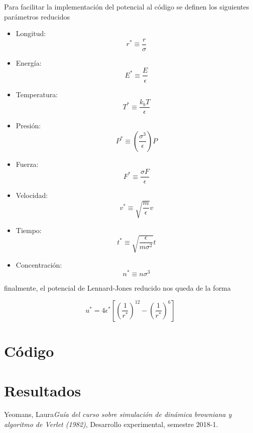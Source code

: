 \documentclass[12pt,letterpaper]{article}
\begin{document}
Para facilitar la implementación del potencial al código se definen los siguientes parámetros reducidos

\begin{itemize}
\item Longitud: \begin{equation*}
r^* \equiv \frac{r}{\sigma}
\end{equation*}
\item Energía: \begin{equation*}
E^* \equiv \frac{E}{\epsilon}
\end{equation*}
\item Temperatura: \begin{equation*}
T^* \equiv \frac{k_bT}{\epsilon}
\end{equation*}
\item Presión: \begin{equation*}
P^* \equiv \left(\frac{\sigma^3}{\epsilon}\right) P
\end{equation*}
\item Fuerza: \begin{equation*}
F^* \equiv \frac{\sigma F}{\epsilon}
\end{equation*}
\item Velocidad: \begin{equation*}
v^* \equiv \sqrt{\frac{m}{\epsilon}}v
\end{equation*}
\item Tiempo: \begin{equation*}
t^* \equiv \sqrt{\frac{\epsilon}{m\sigma^2}}t
\end{equation*}
\item Concentración: \begin{equation*}
n^* \equiv n\sigma^3
\end{equation*}
\end{itemize}
finalmente, el potencial de Lennard-Jones reducido nos queda de la forma 

\begin{equation}
u^* = 4\epsilon^* \left[\left(\frac{1}{r^*}\right)^{12} - \left(\frac{1}{r^*}\right)^6 \right]
\end{equation}


\section*{Código}

\section*{Resultados}

\begin{thebibliography}{widestlabel}
  Yeomans, Laura\emph{Guía del curso sobre simulación de dinámica browniana y algoritmo de Verlet (1982)}, Desarrollo experimental, semestre 2018-1.
\end{thebibliography}
\end{document}
